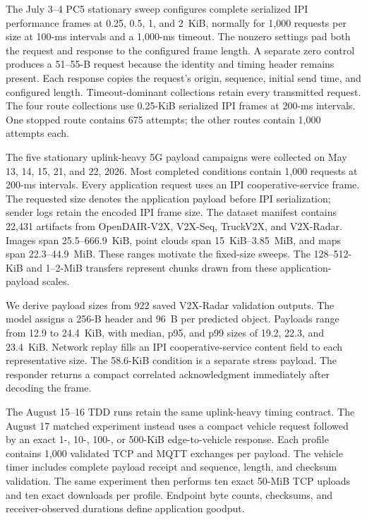 The July 3--4 PC5 stationary sweep configures complete serialized IPI
performance frames at 0.25, 0.5, 1, and 2~KiB, normally for 1,000 requests per
size at 100-ms intervals and a 1,000-ms timeout. The nonzero settings pad both
the request and response to the configured frame length. A separate zero
control produces a 51--55-B request because the identity and timing header
remains present. Each response copies the request's origin, sequence, initial
send time, and configured length. Timeout-dominant collections retain every transmitted
request. The four route collections use 0.25-KiB serialized IPI frames at
200-ms intervals. One stopped route contains
675 attempts; the other routes contain 1,000 attempts each.

The five stationary uplink-heavy 5G payload campaigns were collected on May 13, 14, 15, 21,
and 22, 2026. Most completed conditions contain 1,000 requests at 200-ms
intervals. Every application request uses an IPI cooperative-service frame.
The requested size denotes the application payload before IPI serialization;
sender logs retain the encoded IPI frame size. The dataset manifest contains
22,431 artifacts from
OpenDAIR-V2X, V2X-Seq, TruckV2X, and V2X-Radar. Images span 25.5--666.9~KiB,
point clouds span 15~KiB--3.85~MiB, and maps span 22.3--44.9~MiB. These ranges
motivate the fixed-size sweeps. The 128--512-KiB and 1--2-MiB transfers
represent chunks drawn from these application-payload scales.

We derive payload sizes from 922 saved V2X-Radar validation outputs. The model
assigns a 256-B header and 96~B per predicted object. Payloads range from
12.9 to 24.4~KiB, with median, p95, and p99 sizes of 19.2, 22.3, and
23.4~KiB. Network replay fills an IPI cooperative-service content field to each
representative size. The
58.6-KiB condition is a separate stress payload. The responder returns a
compact correlated acknowledgment immediately after decoding the frame.

The August 15--16 TDD runs retain the same uplink-heavy timing contract. The
August 17 matched experiment instead uses a compact vehicle request followed by
an exact 1-, 10-, 100-, or 500-KiB edge-to-vehicle response. Each profile
contains 1,000 validated TCP and MQTT exchanges per payload. The vehicle timer
includes complete payload receipt and sequence, length, and checksum
validation. The same experiment then performs ten exact 50-MiB TCP
uploads and ten exact downloads per profile. Endpoint byte counts, checksums,
and receiver-observed durations define application goodput.

